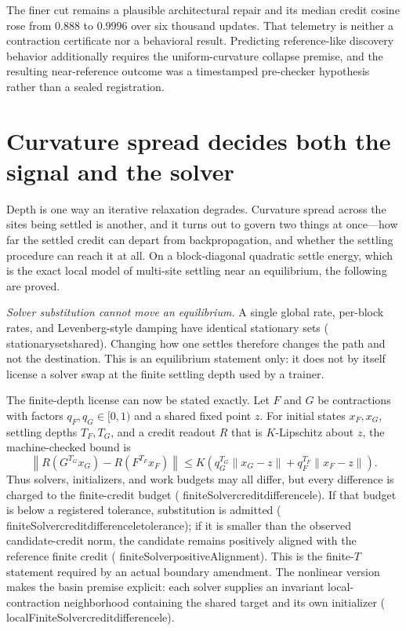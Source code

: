 \documentclass[11pt]{article}
\newcommand{\leanname}[1]{{\scriptsize\ttfamily
  \def\_{\textunderscore\allowbreak}#1}}
\begin{document}
The finer cut remains a plausible architectural repair and its median credit cosine rose
from $0.888$ to $0.9996$ over six thousand updates.  That telemetry is neither a
contraction certificate nor a behavioral result.  Predicting reference-like discovery
behavior additionally requires the uniform-curvature collapse premise, and the resulting
near-reference outcome was a timestamped pre-checker hypothesis rather than a sealed
registration.

\section{Curvature spread decides both the signal and the solver}
\label{sec:block-settling}

Depth is one way an iterative relaxation degrades. Curvature spread across the sites
being settled is another, and it turns out to govern two things at once---how far the
settled credit can depart from backpropagation, and whether the settling procedure can
reach it at all. On a block-diagonal quadratic settle energy, which is the exact local
model of multi-site settling near an equilibrium, the following are proved.

\emph{Solver substitution cannot move an equilibrium.} A single global rate, per-block
rates, and Levenberg-style damping have identical stationary sets
(\leanname{stationary\_set\_shared}). Changing how one settles therefore changes the path
and not the destination. This is an equilibrium statement only: it does not by itself
license a solver swap at the finite settling depth used by a trainer.

The finite-depth license can now be stated exactly. Let $F$ and $G$ be contractions with
factors $q_F,q_G\in[0,1)$ and a shared fixed point $z$. For initial states $x_F,x_G$,
settling depths $T_F,T_G$, and a credit readout $R$ that is $K$-Lipschitz about $z$,
the machine-checked bound is
\[
 \left\|R(G^{T_G}x_G)-R(F^{T_F}x_F)\right\|
 \leq K\left(
 q_G^{T_G}\|x_G-z\|+q_F^{T_F}\|x_F-z\|
 \right).
\]
Thus solvers, initializers, and work budgets may all differ, but every difference is
charged to the finite-credit budget
(\leanname{finiteSolver\_credit\_difference\_le}). If that budget is below a registered
tolerance, substitution is admitted
(\leanname{finiteSolver\_credit\_difference\_le\_tolerance}); if it is smaller than the
observed candidate-credit norm, the candidate remains positively aligned with the
reference finite credit
(\leanname{finiteSolver\_positiveAlignment}). This is the finite-$T$ statement required
by an actual boundary amendment. The nonlinear version makes the basin premise explicit:
each solver supplies an invariant local-contraction neighborhood containing the shared
target and its own initializer
(\leanname{localFiniteSolver\_credit\_difference\_le}).
\end{document}
